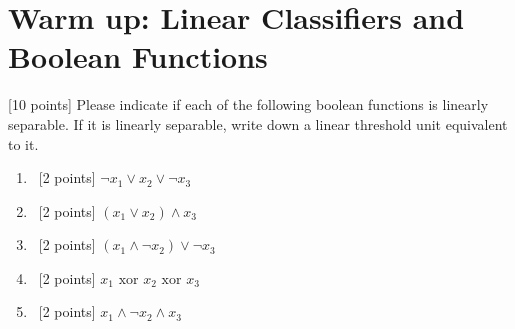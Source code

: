 \section{Warm up: Linear Classifiers and Boolean Functions}\label{sec:q1}

[10 points] Please indicate if each of the following boolean functions is linearly separable.
If it is linearly separable, write down a linear threshold unit equivalent to it.

\begin{enumerate}
\item~[2 points] $\neg x_1\vee x_2\vee\neg x_3$

\item~[2 points] $(x_1\vee x_2)\wedge x_3$

\item~[2 points] $(x_1\wedge\neg x_2)\vee \neg x_3$

\item~[2 points] $x_1\text{ xor } x_2\text{ xor }x_3$

\item~[2 points] $x_1 \wedge \neg x_2\wedge x_3$
\end{enumerate}




